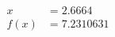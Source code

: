 \documentclass[preview]{standalone}
\begin{document}
\begin{align*}
x &= 2.6664\\f(x) &= 7.2310631
\end{align*}
\end{document}
